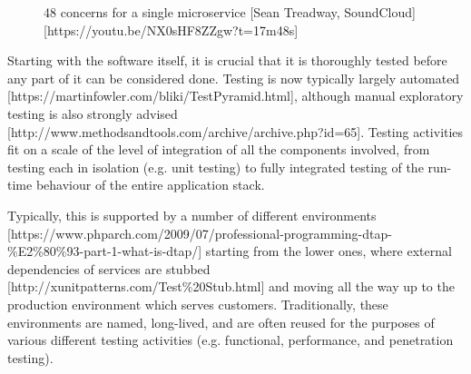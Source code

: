 \documentclass[reprint,amsmath,amssymb,aps]{revtex4-1}
\begin{document}
\begin{figure}[b]
        \setlength{\fboxsep}{1em}
                \caption{48 concerns for a single microservice [Sean Treadway, SoundCloud] [https://youtu.be/NX0sHF8ZZgw?t=17m48s]}
        \label{fig:concerns}
\end{figure}
        
Starting with the software itself, it is crucial that it is thoroughly tested before any part of it can be considered done. Testing is now typically largely automated [https://martinfowler.com/bliki/TestPyramid.html], although manual exploratory testing is also strongly advised [http://www.methodsandtools.com/archive/archive.php?id=65]. Testing activities fit on a scale of the level of integration of all the components involved, from testing each in isolation (e.g. unit testing) to fully integrated testing of the run-time behaviour of the entire application stack. 

Typically, this is supported by a number of different environments [https://www.phparch.com/2009/07/professional-programming-dtap-\%E2\%80\%93-part-1-what-is-dtap/] starting from the lower ones, where external dependencies of services are stubbed [http://xunitpatterns.com/Test\%20Stub.html] and moving all the way up to the production environment which serves customers. Traditionally, these environments are named, long-lived, and are often reused for the purposes of various different testing activities (e.g. functional, performance, and penetration testing).
        
\end{document}
